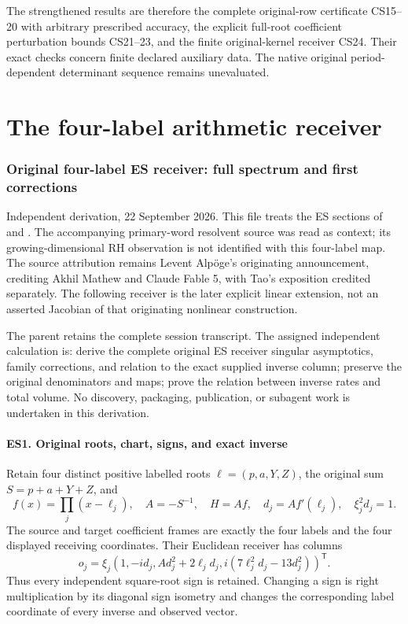 \documentclass[11pt]{article}
\begin{document}
The strengthened results are therefore the complete original-row certificate CS15--20 with arbitrary prescribed accuracy, the explicit full-root coefficient perturbation bounds CS21--23, and the finite original-kernel receiver CS24. Their exact checks concern finite declared auxiliary data. The native original period-dependent determinant sequence remains unevaluated.

\clearpage\part{The four-label arithmetic receiver}
\section{Original four-label ES receiver: full spectrum and first corrections}\label{original-four-label-es-receiver-full-spectrum-and-first-corrections}

Independent derivation, 22 September 2026. This file treats the ES sections of  and . The accompanying primary-word resolvent source was read as context; its growing-dimensional RH observation is not identified with this four-label map. The source attribution remains Levent Alpöge's originating announcement, crediting Akhil Mathew and Claude Fable 5, with Tao's exposition credited separately. The following receiver is the later explicit linear extension, not an asserted Jacobian of that originating nonlinear construction.

The parent retains the complete session transcript. The assigned independent calculation is: derive the complete original ES receiver singular asymptotics, family corrections, and relation to the exact supplied inverse column; preserve the original denominators and maps; prove the relation between inverse rates and total volume. No discovery, packaging, publication, or subagent work is undertaken in this derivation.

\subsection{ES1. Original roots, chart, signs, and exact inverse}\label{es1.-original-roots-chart-signs-and-exact-inverse}

Retain four distinct positive labelled roots \(\ell=(p,a,Y,Z)\), the original sum \(S=p+a+Y+Z\), and \[
f(x)=\prod_j(x-\ell_j),\quad A=-S^{-1},\quad H=Af,\quad d_j=Af'(\ell_j),\quad \xi_j^2d_j=1.
\tag{ES1}
\] The source and target coefficient frames are exactly the four labels and the four displayed receiving coordinates. Their Euclidean receiver has columns \[
o_j=\xi_j(1,-id_j,Ad_j^2+2\ell_jd_j,i(7\ell_j^2d_j-13d_j^2))^{\mathsf T}.
\tag{ES2}
\] Thus every independent square-root sign is retained. Changing a sign is right multiplication by its diagonal sign isometry and changes the corresponding label coordinate of every inverse and observed vector.
\end{document}
